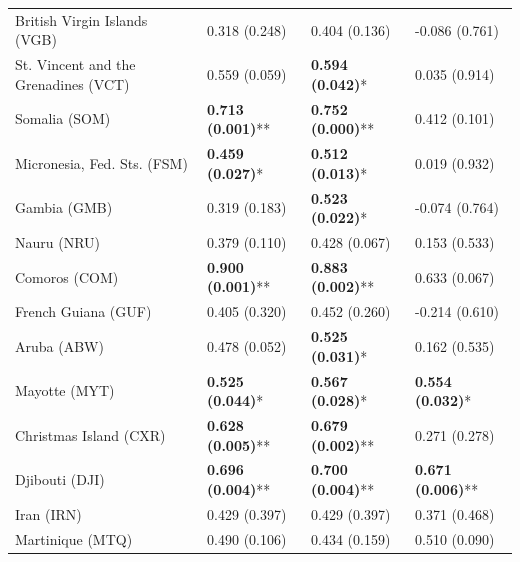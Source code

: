 \begin{longtable}{p{5cm}p{3cm}p{3cm}p{5cm}}
British Virgin Islands (VGB) & \textcolor{atlOrange600}{0.318 (0.248)} & \textcolor{atlOrange600}{0.404 (0.136)} & \textcolor{atlOrange600}{-0.086 (0.761)} \\
St. Vincent and the Grenadines (VCT) & \textcolor{atlOrange600}{0.559 (0.059)} & \textcolor{atlLime600}{\textbf{0.594 (0.042)}*} & \textcolor{atlOrange600}{0.035 (0.914)} \\
Somalia (SOM) & \textcolor{atlLime600}{\textbf{0.713 (0.001)}**} & \textcolor{atlLime600}{\textbf{0.752 (0.000)}**} & \textcolor{atlOrange600}{0.412 (0.101)} \\
Micronesia, Fed. Sts. (FSM) & \textcolor{atlLime600}{\textbf{0.459 (0.027)}*} & \textcolor{atlLime600}{\textbf{0.512 (0.013)}*} & \textcolor{atlOrange600}{0.019 (0.932)} \\
Gambia (GMB) & \textcolor{atlOrange600}{0.319 (0.183)} & \textcolor{atlLime600}{\textbf{0.523 (0.022)}*} & \textcolor{atlOrange600}{-0.074 (0.764)} \\
Nauru (NRU) & \textcolor{atlOrange600}{0.379 (0.110)} & \textcolor{atlOrange600}{0.428 (0.067)} & \textcolor{atlOrange600}{0.153 (0.533)} \\
Comoros (COM) & \textcolor{atlLime600}{\textbf{0.900 (0.001)}**} & \textcolor{atlLime600}{\textbf{0.883 (0.002)}**} & \textcolor{atlOrange600}{0.633 (0.067)} \\
French Guiana (GUF) & \textcolor{atlOrange600}{0.405 (0.320)} & \textcolor{atlOrange600}{0.452 (0.260)} & \textcolor{atlOrange600}{-0.214 (0.610)} \\
Aruba (ABW) & \textcolor{atlOrange600}{0.478 (0.052)} & \textcolor{atlLime600}{\textbf{0.525 (0.031)}*} & \textcolor{atlOrange600}{0.162 (0.535)} \\
Mayotte (MYT) & \textcolor{atlLime600}{\textbf{0.525 (0.044)}*} & \textcolor{atlLime600}{\textbf{0.567 (0.028)}*} & \textcolor{atlLime600}{\textbf{0.554 (0.032)}*} \\
Christmas Island (CXR) & \textcolor{atlLime600}{\textbf{0.628 (0.005)}**} & \textcolor{atlLime600}{\textbf{0.679 (0.002)}**} & \textcolor{atlOrange600}{0.271 (0.278)} \\
Djibouti (DJI) & \textcolor{atlLime600}{\textbf{0.696 (0.004)}**} & \textcolor{atlLime600}{\textbf{0.700 (0.004)}**} & \textcolor{atlLime600}{\textbf{0.671 (0.006)}**} \\
Iran (IRN) & \textcolor{atlOrange600}{0.429 (0.397)} & \textcolor{atlOrange600}{0.429 (0.397)} & \textcolor{atlOrange600}{0.371 (0.468)} \\
Martinique (MTQ) & \textcolor{atlOrange600}{0.490 (0.106)} & \textcolor{atlOrange600}{0.434 (0.159)} & \textcolor{atlOrange600}{0.510 (0.090)} \\

\end{longtable}
